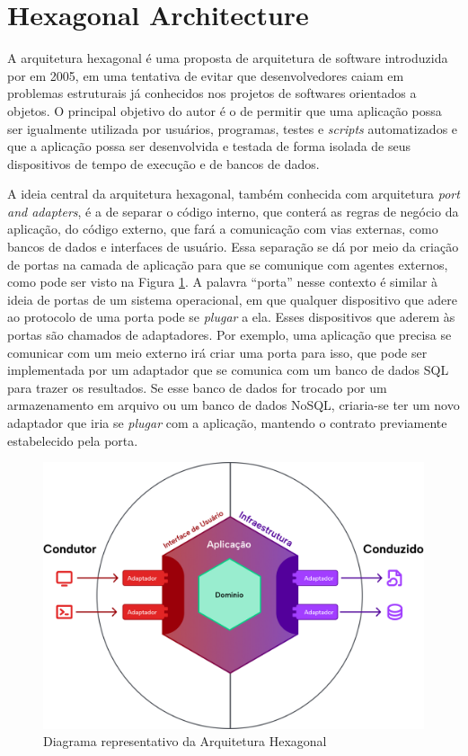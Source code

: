 \documentclass[12pt, %
openright, 
oneside, %
a4paper,    %
brazil]{facom-ufu-abntex2}
\begin{document}
\section{Hexagonal Architecture}
A arquitetura hexagonal é uma proposta de arquitetura de software introduzida por  em 2005, em uma tentativa de evitar que desenvolvedores caiam em problemas estruturais já conhecidos nos projetos de softwares orientados a objetos. O principal objetivo do autor é o de permitir que uma aplicação possa ser igualmente utilizada por usuários, programas, testes e \textit{scripts} automatizados e que a aplicação possa ser desenvolvida e testada de forma isolada de seus dispositivos de tempo de execução e de bancos de dados.

A ideia central da arquitetura hexagonal, também conhecida com arquitetura \textit{port and adapters}, é a de separar o código interno, que conterá as regras de negócio da aplicação, do código externo, que fará a comunicação com vias externas, como bancos de dados e interfaces de usuário. Essa separação se dá por meio da criação de portas na camada de aplicação para que se comunique com agentes externos, como pode ser visto na Figura \ref{fig:hex_arch_diagram}. A palavra ``porta'' nesse contexto é similar à ideia de portas de um sistema operacional, em que qualquer dispositivo que adere ao protocolo de uma porta pode se \textit{plugar} a ela. Esses dispositivos que aderem às portas são chamados de adaptadores. Por exemplo, uma aplicação que precisa se comunicar com um meio externo irá criar uma porta para isso, que pode ser implementada por um adaptador que se comunica com um banco de dados SQL para trazer os resultados. Se esse banco de dados for trocado por um armazenamento em arquivo ou um banco de dados NoSQL, criaria-se ter um novo adaptador que iria se \textit{plugar} com a aplicação, mantendo o contrato previamente estabelecido pela porta.

\begin{figure}[ht]
    \centering
    \includegraphics[width=.6\textwidth]{figures/bibliographical_review/hex_arch_diagram.png}
    \caption{Diagrama representativo da Arquitetura Hexagonal}
    \label{fig:hex_arch_diagram}
\end{figure}
\end{document}
